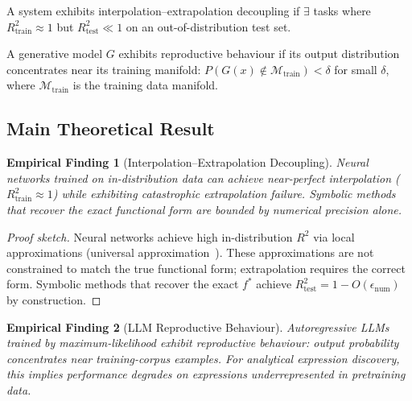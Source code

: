 \documentclass[twoside,11pt]{article}
\newcommand{\Rsq}{R^{2}}
\newcommand{\Rtrain}{R^{2}_{\mathrm{train}}}
\newcommand{\Rtest}{R^{2}_{\mathrm{test}}}
\newtheorem{finding}{Empirical Finding}
\begin{document}
\begin{definition}
\label{def:decoupling}
A system exhibits interpolation--extrapolation decoupling if $\exists$ tasks where $\Rtrain \approx 1$ but $\Rtest \ll 1$ on an out-of-distribution test set.
\end{definition}

\begin{definition}
\label{def:reproductive}
A generative model $G$ exhibits reproductive behaviour if its output distribution concentrates near its training manifold: $P(G(x) \notin \mathcal{M}_{\text{train}}) < \delta$ for small $\delta$, where $\mathcal{M}_{\text{train}}$ is the training data manifold.
\end{definition}

\subsection{Main Theoretical Result}\label{subsec:main-theoretical-result}
\label{sec:theory_main}

\begin{finding}[Interpolation--Extrapolation Decoupling]
\label{prop:interp_extrap_decoupling}
Neural networks trained on in-distribution data can achieve near-perfect interpolation ($\Rtrain \approx 1$) while exhibiting catastrophic extrapolation failure. Symbolic methods that recover the exact functional form are bounded by numerical precision alone.
\end{finding}

\begin{proof}[Proof sketch]
Neural networks achieve high in-distribution $\Rsq$ via local approximations (universal approximation~\citep{hornik1989multilayer}). These approximations are not constrained to match the true functional form; extrapolation requires the correct form. Symbolic methods that recover the exact $f^*$ achieve $\Rtest = 1 - O(\epsilon_{\text{num}})$ by construction.
\end{proof}

\begin{finding}[LLM Reproductive Behaviour]
\label{thm:llm_reproductive}
Autoregressive LLMs trained by maximum-likelihood exhibit reproductive behaviour: output probability concentrates near training-corpus examples. For analytical expression discovery, this implies performance degrades on expressions underrepresented in pretraining data.
\end{finding}
\end{document}
